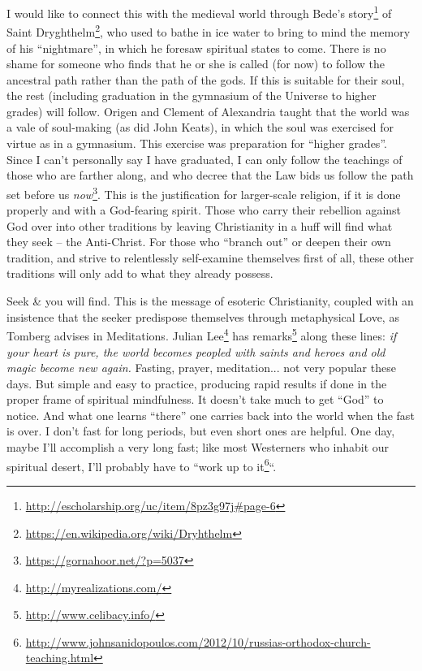 I would like to connect this with the medieval world through Bede's story\footnote{\url{http://escholarship.org/uc/item/8pz3g97j\#page-6}} of Saint Dryghthelm\footnote{\url{https://en.wikipedia.org/wiki/Dryhthelm}}, who used to bathe in ice water to bring to mind the memory of his ``nightmare'', in which he foresaw spiritual states to come. There is no shame for someone who finds that he or she is called (for now) to follow the ancestral path rather than the path of the gods. If this is suitable for their soul, the rest (including graduation in the gymnasium of the Universe to higher grades) will follow. Origen and Clement of Alexandria taught that the world was a vale of soul-making (as did John Keats), in which the soul was exercised for virtue as in a gymnasium. This exercise was preparation for ``higher grades''. Since I can't personally say I have graduated, I can only follow the teachings of those who are farther along, and who decree that the Law bids us follow the path set before us \emph{now}\footnote{\url{https://gornahoor.net/?p=5037}}. This is the justification for larger-scale religion, if it is done properly and with a God-fearing spirit. Those who carry their rebellion against God over into other traditions by leaving Christianity in a huff will find what they seek -- the Anti-Christ. For those who ``branch out'' or deepen their own tradition, and strive to relentlessly self-examine themselves first of all, these other traditions will only add to what they already possess.

Seek \& you will find. This is the message of esoteric Christianity, coupled with an insistence that the seeker predispose themselves through metaphysical Love, as Tomberg advises in Meditations. Julian Lee\footnote{\url{http://myrealizations.com/}} has remarks\footnote{\url{http://www.celibacy.info/}} along these lines: \emph{if your heart is pure, the world becomes peopled with saints and heroes and old magic become new again.} Fasting, prayer, meditation... not very popular these days. But simple and easy to practice, producing rapid results if done in the proper frame of spiritual mindfulness. It doesn't take much to get ``God'' to notice. And what one learns ``there'' one carries back into the world when the fast is over. I don't fast for long periods, but even short ones are helpful. One day, maybe I'll accomplish a very long fast; like most Westerners who inhabit our spiritual desert, I'll probably have to ``work up to it\footnote{\url{http://www.johnsanidopoulos.com/2012/10/russias-orthodox-church-teaching.html}}``.

